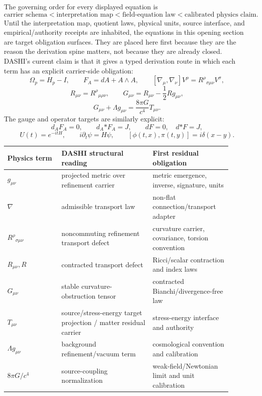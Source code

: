 \documentclass[11pt]{article}
\theoremstyle{definition}
\theoremstyle{plain}
\theoremstyle{remark}
\begin{document}
The governing order for every displayed equation is
\[
\text{carrier schema} < \text{interpretation map} <
\text{field-equation law} < \text{calibrated physics claim}.
\]
Until the interpretation map, quotient laws, physical units, source interface,
and empirical/authority receipts are inhabited, the equations in this opening
section are target obligation surfaces. They are placed here first because they
are the reason the derivation spine matters, not because they are already
closed.
DASHI's current claim is that it gives a typed derivation route in which each
term has an explicit carrier-side obligation:
\[
\Omega_p=H_p-I,
\qquad
F_A=dA+A\wedge A,
\qquad
[\nabla_\mu,\nabla_\nu]V^\rho
=R^\rho{}_{\sigma\mu\nu}V^\sigma,
\]
\[
R_{\mu\nu}=R^\rho{}_{\mu\rho\nu},
\qquad
G_{\mu\nu}=R_{\mu\nu}-\frac12Rg_{\mu\nu},
\]
\[
G_{\mu\nu}+\Lambda g_{\mu\nu}
=
\frac{8\pi G}{c^4}T_{\mu\nu}.
\]
The gauge and operator targets are similarly explicit:
\[
d_AF_A=0,
\qquad
d_A{*F_A}=J,
\qquad
dF=0,\quad d{*F}=J,
\]
\[
U(t)=e^{-itH},
\qquad
i\partial_t\psi=H\psi,
\qquad
[\phi(t,x),\pi(t,y)]=i\delta(x-y).
\]

\begin{center}
\small
\begin{tabular}{p{0.22\linewidth}p{0.37\linewidth}p{0.32\linewidth}}
\toprule
Physics term & DASHI structural reading & First residual obligation \\
\midrule
\(g_{\mu\nu}\) & projected metric over refinement carrier & metric emergence, inverse, signature, units \\
\(\nabla\) & admissible transport law & non-flat connection/transport adapter \\
\(R^\rho{}_{\sigma\mu\nu}\) & noncommuting refinement transport defect & curvature carrier, covariance, torsion convention \\
\(R_{\mu\nu},R\) & contracted transport defect & Ricci/scalar contraction and index laws \\
\(G_{\mu\nu}\) & stable curvature-obstruction tensor & contracted Bianchi/divergence-free law \\
\(T_{\mu\nu}\) & source/stress-energy target projection / matter residual carrier & stress-energy interface and authority \\
\(\Lambda g_{\mu\nu}\) & background refinement/vacuum term & cosmological convention and calibration \\
\(8\pi G/c^4\) & source-coupling normalization & weak-field/Newtonian limit and unit calibration \\
\bottomrule
\end{tabular}
\end{center}
\end{document}
